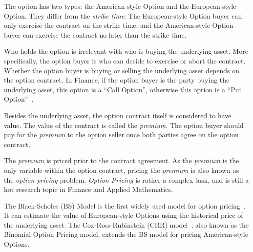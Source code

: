 The option has two types: the American-style Option and the European-style Option.
They differ from the \textit{strike time}:
The European-style Option buyer can only exercise the contract on the strike time,
and the American-style Option buyer can exercise the contract no later than the strike time.

Who holds the option is irrelevant with who is buying the underlying asset.
More specifically, the option buyer is who can decide to exercise or abort the contract.
Whether the option buyer is buying or selling the underlying asset depends on the option contract.
In Finance, if the option buyer is the party buying the underlying asset, this option is a ``Call Option'',
otherwise this option is a ``Put Option''~\cite{smith2004history-option}.

Besides the underlying asset, the option contract itself is considered to have value.
The value of the contract is called the \textit{premium}.
The option buyer should pay for the \textit{premium} to the option seller once both parties agree on the option contract.

The \textit{premium} is priced prior to the contract agreement.
As the \textit{premium} is the only variable within the option contract,
pricing the \textit{premium} is also known as the \textit{option pricing} problem.
\textit{Option Pricing} is rather a complex task, and is still a hot research topic in Finance and Applied Mathematics.

The Black-Scholes (BS) Model is the first widely used model for option pricing~\cite{black1973pricing}.
It can estimate the value of European-style Options using the historical price of the underlying asset.
The Cox-Ross-Rubinstein (CRR) model~\cite{cox1979option}, also known as the Binomial Option Pricing model, extends the BS model for pricing American-style Options.
